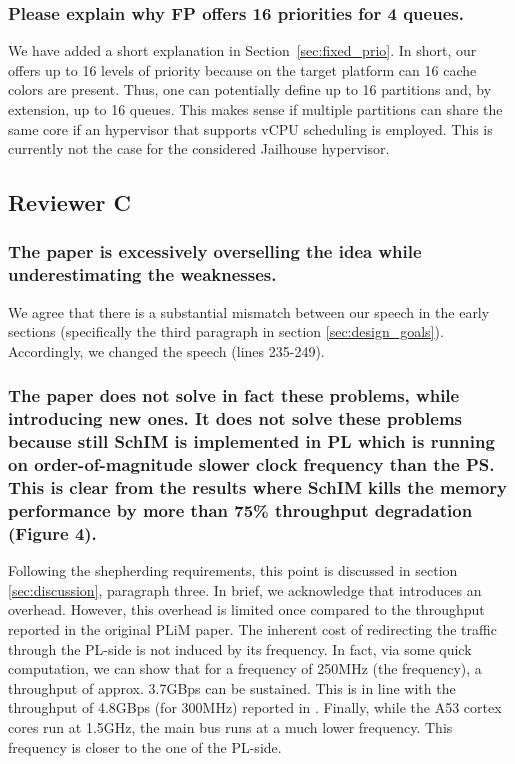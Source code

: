        \subsubsection{Please explain why FP offers 16 priorities for
        4 queues.}

        We have added a short explanation in
        Section~\ref{sec:fixed_prio}. In short, our \schim offers up
        to 16 levels of priority because on the target platform can 16
        cache colors are present. Thus, one can potentially define up
        to 16 partitions and, by extension, up to 16 queues. This
        makes sense if multiple partitions can share the same core if
        an hypervisor that supports vCPU scheduling is employed. This
        is currently not the case for the considered Jailhouse
        hypervisor.

    \subsection{Reviewer C}
        \subsubsection{The paper is excessively overselling the idea while underestimating the weaknesses.}
            We agree that there is a substantial mismatch between our speech in the early sections (specifically the third paragraph in section \ref{sec:design_goals}).
            Accordingly, we changed the speech (lines 235-249).

        \subsubsection{The paper does not solve in fact these problems, while introducing new ones. It does not solve these problems because still SchIM is implemented in PL which is running on order-of-magnitude slower clock frequency than the PS. This is clear from the results where SchIM kills the memory performance by more than 75\% throughput degradation (Figure 4).}
            Following the shepherding requirements, this point is discussed in section \ref{sec:discussion}, paragraph three.
            In brief, we acknowledge that \schim introduces an overhead. However, this overhead is limited once compared to the throughput reported in the original PLiM paper.
            The inherent cost of redirecting the traffic through the PL-side is not induced by its frequency. In fact, via some quick computation, we can show that for a frequency of 250MHz (the \schim frequency), a throughput of approx. 3.7GBps can be sustained. This is in line with the throughput of 4.8GBps (for 300MHz) reported in \cite{uiuc-xilinx-port-study}.
            Finally, while the A53 cortex cores run at 1.5GHz, the main bus runs at a much lower frequency. This frequency is closer to the one of the PL-side.

